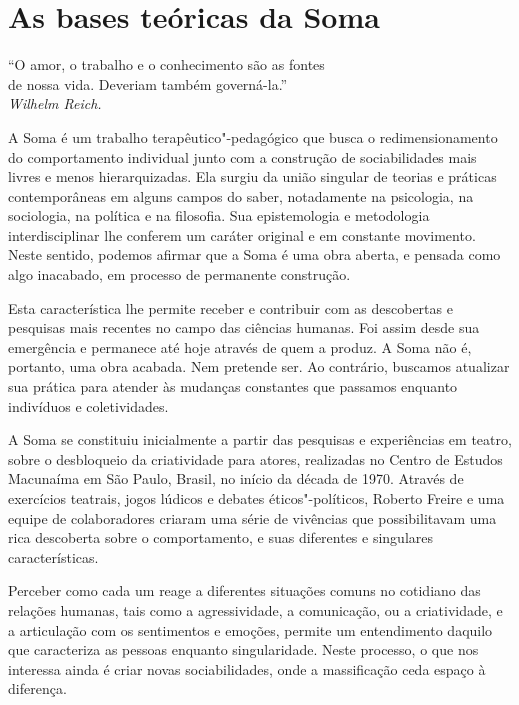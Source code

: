 \chapter*{As bases teóricas da Soma}

\begin{flushright}
\scriptsize{``O amor, o trabalho e o conhecimento são as fontes\\ de nossa vida.
Deveriam também governá-la.''\\ \emph{Wilhelm Reich.}}
\end{flushright}

A Soma é um trabalho terapêutico"-pedagógico que busca o
redimensionamento do comportamento individual junto com a construção de
sociabilidades mais livres e menos hierarquizadas. Ela surgiu da união
singular de teorias e práticas contemporâneas em alguns campos do saber,
notadamente na psicologia, na sociologia, na política e na filosofia.
Sua epistemologia e metodologia interdisciplinar lhe conferem um caráter
original e em constante movimento. Neste sentido, podemos afirmar que a
Soma é uma obra aberta, e pensada como algo inacabado, em processo de
permanente construção.

Esta característica lhe permite receber e contribuir com as descobertas
e pesquisas mais recentes no campo das ciências humanas. Foi assim desde
sua emergência e permanece até hoje através de quem a produz. A Soma não
é, portanto, uma obra acabada. Nem pretende ser. Ao contrário, buscamos
atualizar sua prática para atender às mudanças constantes que passamos
enquanto indivíduos e coletividades.

A Soma se constituiu inicialmente a partir das pesquisas e experiências
em teatro, sobre o desbloqueio da criatividade para atores, realizadas
no Centro de Estudos Macunaíma em São Paulo, Brasil, no início da década
de 1970. Através de exercícios teatrais, jogos lúdicos e debates
éticos"-políticos, Roberto Freire e uma equipe de colaboradores criaram
uma série de vivências que possibilitavam uma rica descoberta sobre o
comportamento, e suas diferentes e singulares características.

Perceber como cada um reage a diferentes situações comuns no cotidiano
das relações humanas, tais como a agressividade, a comunicação, ou a
criatividade, e a articulação com os sentimentos e emoções, permite um
entendimento daquilo que caracteriza as pessoas enquanto singularidade.
Neste processo, o que nos interessa ainda é criar novas sociabilidades,
onde a massificação ceda espaço à diferença.

